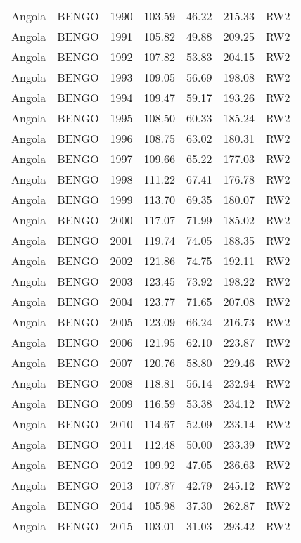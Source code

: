 \begin{longtable}{lllrrrl}
  Angola & BENGO & 1990 & 103.59 & 46.22 & 215.33 & RW2 \\ 
  Angola & BENGO & 1991 & 105.82 & 49.88 & 209.25 & RW2 \\ 
  Angola & BENGO & 1992 & 107.82 & 53.83 & 204.15 & RW2 \\ 
  Angola & BENGO & 1993 & 109.05 & 56.69 & 198.08 & RW2 \\ 
  Angola & BENGO & 1994 & 109.47 & 59.17 & 193.26 & RW2 \\ 
  Angola & BENGO & 1995 & 108.50 & 60.33 & 185.24 & RW2 \\ 
  Angola & BENGO & 1996 & 108.75 & 63.02 & 180.31 & RW2 \\ 
  Angola & BENGO & 1997 & 109.66 & 65.22 & 177.03 & RW2 \\ 
  Angola & BENGO & 1998 & 111.22 & 67.41 & 176.78 & RW2 \\ 
  Angola & BENGO & 1999 & 113.70 & 69.35 & 180.07 & RW2 \\ 
  Angola & BENGO & 2000 & 117.07 & 71.99 & 185.02 & RW2 \\ 
  Angola & BENGO & 2001 & 119.74 & 74.05 & 188.35 & RW2 \\ 
  Angola & BENGO & 2002 & 121.86 & 74.75 & 192.11 & RW2 \\ 
  Angola & BENGO & 2003 & 123.45 & 73.92 & 198.22 & RW2 \\ 
  Angola & BENGO & 2004 & 123.77 & 71.65 & 207.08 & RW2 \\ 
  Angola & BENGO & 2005 & 123.09 & 66.24 & 216.73 & RW2 \\ 
  Angola & BENGO & 2006 & 121.95 & 62.10 & 223.87 & RW2 \\ 
  Angola & BENGO & 2007 & 120.76 & 58.80 & 229.46 & RW2 \\ 
  Angola & BENGO & 2008 & 118.81 & 56.14 & 232.94 & RW2 \\ 
  Angola & BENGO & 2009 & 116.59 & 53.38 & 234.12 & RW2 \\ 
  Angola & BENGO & 2010 & 114.67 & 52.09 & 233.14 & RW2 \\ 
  Angola & BENGO & 2011 & 112.48 & 50.00 & 233.39 & RW2 \\ 
  Angola & BENGO & 2012 & 109.92 & 47.05 & 236.63 & RW2 \\ 
  Angola & BENGO & 2013 & 107.87 & 42.79 & 245.12 & RW2 \\ 
  Angola & BENGO & 2014 & 105.98 & 37.30 & 262.87 & RW2 \\ 
  Angola & BENGO & 2015 & 103.01 & 31.03 & 293.42 & RW2 \\ 

\end{longtable}
